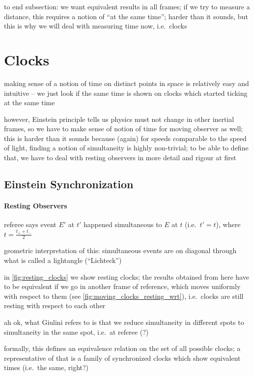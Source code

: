 to end subsection: we want equivalent results in all frames; if we try to measure a distance, this requires a notion of \enquote{at the same time}; harder than it sounds, but this is why we will deal with measuring time now, i.e.~clocks



\newpage



	\section{Clocks}%
making sense of a notion of time on distinct points in space is relatively easy and intuitive -- we just look if the same time is shown on clocks which started ticking at the same time

however, Einstein principle tells us physics must not change in other inertial frames, so we have to make sense of notion of time for moving observer as well; this is harder than it sounds because (again) for speeds comparable to the speed of light, finding a notion of simultaneity is highly non-trivial; to be able to define that, we have to deal with resting observers in more detail and rigour at first



		\subsection{Einstein Synchronization}
			\paragraph{Resting Observers}
referee says event $E'$ at $t'$ happened simultaneous to $E$ at $t$ (i.e.~$t' = t$), where $t = \frac{t_+ + t_-}{2}$

geometric interpretation of this: simultaneous events are on diagonal through what is called a lightangle (\enquote{Lichteck})


in \ref{fig:resting_clocks} we show resting clocks; the results obtained from here have to be equivalent if we go in another frame of reference, which moves uniformly with respect to them (see \ref{fig:moving_clocks_resting_wrt}), i.e.~clocks are still resting with respect to each other


ah ok, what Giulini refers to is that we reduce simultaneity in different spots to simultaneity in the same spot, i.e.~at referee (?)


formally, this defines an equivalence relation on the set of all possible clocks; a representative of that is a family of synchronized clocks which show equivalent times (i.e.~the same, right?)


